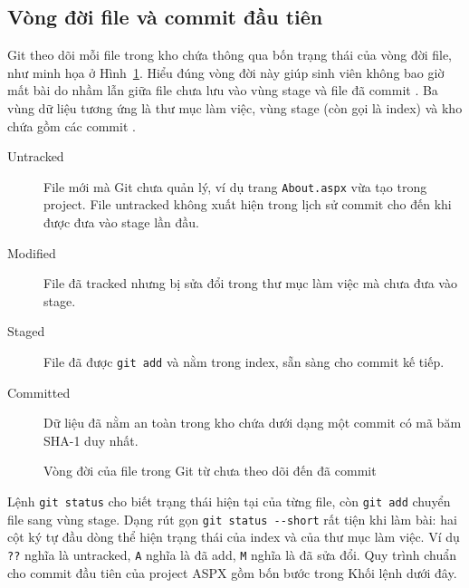 \subsection{Vòng đời file và commit đầu tiên}
\label{subsec:c22-lifecycle}

Git theo dõi mỗi file trong kho chứa thông qua bốn trạng thái của vòng đời file, như minh họa ở Hình~\ref{fig:c22-lifecycle}.
Hiểu đúng vòng đời này giúp sinh viên không bao giờ mất bài do nhầm lẫn giữa file chưa lưu vào vùng stage và file đã commit \cite{progit}.
Ba vùng dữ liệu tương ứng là thư mục làm việc, vùng stage (còn gọi là index) và kho chứa gồm các commit \cite{atlassiangit}.

\begin{description}
\item[Untracked] File mới mà Git chưa quản lý, ví dụ trang \verb|About.aspx| vừa tạo trong project.
File untracked không xuất hiện trong lịch sử commit cho đến khi được đưa vào stage lần đầu.
\item[Modified] File đã tracked nhưng bị sửa đổi trong thư mục làm việc mà chưa đưa vào stage.
\item[Staged] File đã được \verb|git add| và nằm trong index, sẵn sàng cho commit kế tiếp.
\item[Committed] Dữ liệu đã nằm an toàn trong kho chứa dưới dạng một commit có mã băm SHA-1 duy nhất.
\end{description}

\begin{figure}[H]
\centering
{}
\caption{Vòng đời của file trong Git từ chưa theo dõi đến đã commit}
\label{fig:c22-lifecycle}
\end{figure}

Lệnh \verb|git status| cho biết trạng thái hiện tại của từng file, còn \verb|git add| chuyển file sang vùng stage.
Dạng rút gọn \verb|git status --short| rất tiện khi làm bài: hai cột ký tự đầu dòng thể hiện trạng thái của index và của thư mục làm việc.
Ví dụ \verb|??| nghĩa là untracked, \verb|A| nghĩa là đã add, \verb|M| nghĩa là đã sửa đổi.
Quy trình chuẩn cho commit đầu tiên của project ASPX gồm bốn bước trong Khối lệnh dưới đây.

